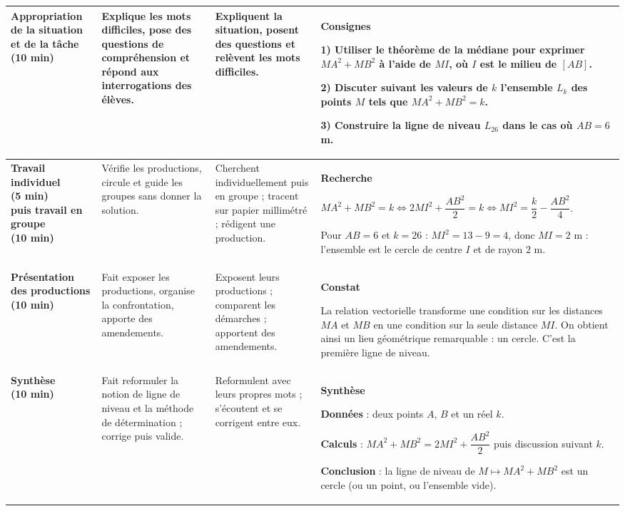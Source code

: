 \documentclass[10pt,a4paper]{article}
\providecommand{\hl}[1]{\colorbox{cHl}{#1}}                  %
\begin{document}
{\begin{longtable}{|L{3.0cm}|L{4.5cm}|L{3.5cm}|L{5.5cm}|}
\textbf{\color{cEx}Appropriation de la situation et de la tâche\newline(10 min)}
& Explique les mots difficiles, pose des questions de compréhension et répond aux interrogations des élèves.
& Expliquent la situation, posent des questions et relèvent les mots difficiles.
& \textbf{\color{cEx}Consignes}\par
1) Utiliser le théorème de la médiane pour exprimer $MA^2+MB^2$ à l'aide de $MI$, où $I$ est le milieu de $[AB]$.\par
2) Discuter suivant les valeurs de $k$ l'ensemble $L_k$ des points $M$ tels que $MA^2+MB^2=k$.\par
3) Construire la ligne de niveau $L_{26}$ dans le cas où $AB=6$ m.
\\\hline

\textbf{\color{cMeth}Travail individuel\newline(5 min)\newline puis travail en groupe\newline(10 min)}
& Vérifie les productions, circule et guide les groupes sans donner la solution.
& Cherchent individuellement puis en groupe ; tracent sur papier millimétré ; rédigent une production.
& \textbf{\color{cMeth}Recherche}\par
$MA^2+MB^2=k \Longleftrightarrow 2MI^2+\dfrac{AB^2}{2}=k \Longleftrightarrow MI^2=\dfrac{k}{2}-\dfrac{AB^2}{4}$.\par
Pour $AB=6$ et $k=26$ : $MI^2=13-9=4$, donc $MI=2$ m : l'ensemble est le cercle de centre $I$ et de rayon $2$ m.
\\\hline

\textbf{\color{cProp}Présentation des productions\newline(10 min)}
& Fait exposer les productions, organise la confrontation, apporte des amendements.
& Exposent leurs productions ; comparent les démarches ; apportent des amendements.
& \textbf{\color{cProp}Constat}\par
La relation vectorielle transforme une condition sur les distances $MA$ et $MB$ en une condition sur la seule distance $MI$. On obtient ainsi un \hl{lieu géométrique} remarquable : un cercle. C'est la première \hl{ligne de niveau}.
\\\hline

\textbf{\color{cProp}Synthèse\newline(10 min)}
& Fait reformuler la notion de ligne de niveau et la méthode de détermination ; corrige puis valide.
& Reformulent avec leurs propres mots ; s'écoutent et se corrigent entre eux.
& \textbf{\color{cProp}Synthèse}\par
\textbf{Données} : deux points $A$, $B$ et un réel $k$.\par
\textbf{Calculs} : $MA^2+MB^2=2MI^2+\dfrac{AB^2}{2}$ puis discussion suivant $k$.\par
\textbf{Conclusion} : la ligne de niveau de $M\mapsto MA^2+MB^2$ est un cercle (ou un point, ou l'ensemble vide).
\\\hline


\end{longtable}}
\end{document}
